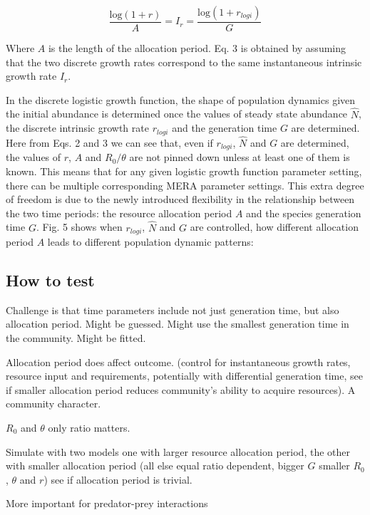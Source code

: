 \documentclass[12pt]{article}
\begin{document}
\begin{equation}
 \frac{ \mbox{log} (1+r) }{A} = I_r = \frac{ \mbox{log} (1+r_{logi}) }{G}
\end{equation}

Where $A$ is the length of the allocation period. Eq. 3 is obtained by assuming that the two discrete growth rates correspond to the same instantaneous intrinsic growth rate $I_r$. 

In the discrete logistic growth function, the shape of population dynamics given the initial abundance is determined once the values of steady state abundance $\hat{N}$, the discrete intrinsic growth rate $r_{logi}$ and the generation time $G$ are determined. Here from Eqs. 2 and 3 we can see that, even if $r_{logi}$, $\hat{N}$ and $G$ are determined, the values of $r$, $A$ and $R_0/\theta$ are not pinned down unless at least one of them is known. This means that for any given logistic growth function parameter setting, there can be multiple corresponding MERA parameter settings. This extra degree of freedom is due to the newly introduced flexibility in the relationship between the two time periods: the resource allocation period $A$ and the species generation time $G$. Fig. 5 shows when $r_{logi}$, $\hat{N}$ and $G$ are controlled, how different allocation period $A$ leads to different population dynamic patterns:




\subsection{How to test}
Challenge is that time parameters include not just generation time, but also allocation period. Might be guessed. Might use the smallest generation time in the community. Might be fitted. 

Allocation period does affect outcome. (control for instantaneous growth rates, resource input and requirements, potentially with differential generation time, see if smaller allocation period reduces community's ability to acquire resources). A community character. 

$R_0$ and $\theta$ only ratio matters.

Simulate with two models one with larger resource allocation period, the other with smaller allocation period (all else equal ratio dependent, bigger $G$ smaller $R_0$, $\theta$ and $r$) see if allocation period is trivial.

More important for predator-prey interactions
\end{document}
